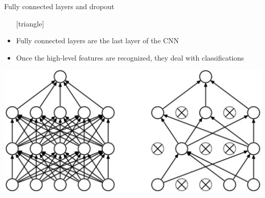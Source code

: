 \documentclass{beamer}
\begin{document}
\begin{frame}{Fully connected layers and dropout}
	\begin{itemize}
		\setlength\itemsep{1em}
		[triangle]
		\item 
			Fully connected layers are the last layer of the CNN
		\item 
			Once the high-level features are recognized, they deal with classifications
	\end{itemize}
	\begin{center}
		\includegraphics[scale=0.35]{dropout}
	\end{center}
\end{frame}
\end{document}
